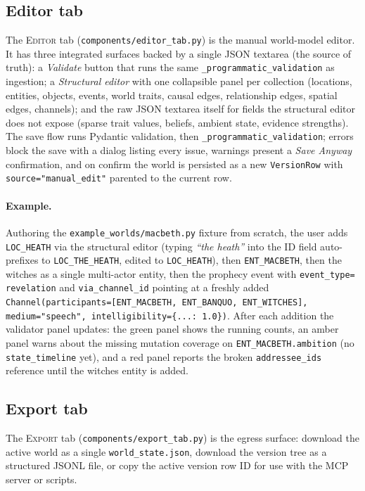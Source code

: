 \documentclass[11pt]{article}
\begin{document}
\subsection{Editor tab}
\label{app:ui-editor}

The \textsc{Editor} tab
(\texttt{components/editor\_tab.py}) is the manual world-model
editor. It has three integrated surfaces backed by a single JSON
textarea (the source of truth): a \emph{Validate} button that
runs the same \texttt{\_programmatic\_validation} as ingestion;
a \emph{Structural editor} with one collapsible panel per
collection (locations, entities, objects, events, world traits,
causal edges, relationship edges, spatial edges, channels); and
the raw JSON textarea itself for fields the structural editor
does not expose (sparse trait values, beliefs, ambient state,
evidence strengths). The save flow runs Pydantic validation, then
\texttt{\_programmatic\_validation}; errors block the save with a
dialog listing every issue, warnings present a \emph{Save Anyway}
confirmation, and on confirm the world is persisted as a new
\texttt{VersionRow} with \texttt{source="manual\_edit"} parented
to the current row.

\paragraph{Example.} Authoring the
\texttt{example\_worlds/macbeth.py} fixture from scratch, the
user adds \texttt{LOC\_HEATH} via the structural editor (typing
\emph{``the heath''} into the ID field auto-prefixes to
\texttt{LOC\_THE\_HEATH}, edited to \texttt{LOC\_HEATH}), then
\texttt{ENT\_MACBETH}, then the witches as a single multi-actor
entity, then the prophecy event with \texttt{event\_type=
revelation} and \texttt{via\_channel\_id} pointing at a freshly
added \texttt{Channel(participants=[ENT\_MACBETH, ENT\_BANQUO,
ENT\_WITCHES], medium="speech", intelligibility=\{...: 1.0\})}.
After each addition the validator panel updates: the green panel
shows the running counts, an amber panel warns about the missing
mutation coverage on \texttt{ENT\_MACBETH.ambition} (no
\texttt{state\_timeline} yet), and a red panel reports the
broken \texttt{addressee\_ids} reference until the witches entity
is added.

\subsection{Export tab}
\label{app:ui-export}

The \textsc{Export} tab
(\texttt{components/export\_tab.py}) is the egress surface:
download the active world as a single \texttt{world\_state.json},
download the version tree as a structured JSONL file, or copy the
active version row ID for use with the MCP server or scripts.
\end{document}
